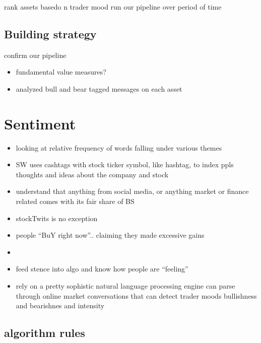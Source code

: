 \documentclass[11pt,]{article}
\providecommand{\tightlist}{%
\setlength{\itemsep}{0pt}\setlength{\parskip}{0pt}}
\begin{document}
rank assets basedo n trader mood run our pipeline over period of time

\hypertarget{building-strategy}{%
\subsection{Building strategy}\label{building-strategy}}

confirm our pipeline

\begin{itemize}
\tightlist
\item
  fundamental value measures?
\item
  analyzed bull and bear tagged messages on each asset
\end{itemize}

\hypertarget{sentiment}{%
\section{Sentiment}\label{sentiment}}

\begin{itemize}
\item
  looking at relative frequency of words falling under various themes
\item
  SW uses cashtags with stock ticker symbol, like hashtag, to index ppls
  thoughts and ideas about the company and stock
\item
  understand that anything from social media, or anything market or
  finance related comes with its fair share of BS
\item
  stockTwits is no exception
\item
  people ``BuY right now''.. claiming they made excessive gains
\item
\item
  feed stence into algo and know how people are ``feeling''
\item
  rely on a pretty sophistic natural language processing engine can
  parse through online market conversations that can detect trader moods
  bullishness and bearishnes and intensity
\end{itemize}

\hypertarget{algorithm-rules}{%
\subsection{algorithm rules}\label{algorithm-rules}}

\hypertarget{section}{%
\section{}\label{section}}
\end{document}

